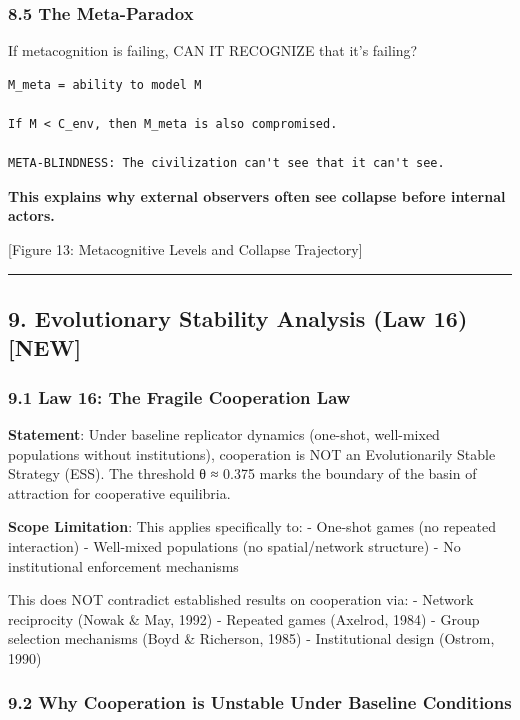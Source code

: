 \documentclass[11pt,letterpaper]{article}
\begin{document}
\subsubsection{8.5 The Meta-Paradox}\label{the-meta-paradox}

If metacognition is failing, CAN IT RECOGNIZE that it's failing?

\begin{verbatim}
M_meta = ability to model M

If M < C_env, then M_meta is also compromised.

META-BLINDNESS: The civilization can't see that it can't see.
\end{verbatim}

\textbf{This explains why external observers often see collapse before
internal actors.}

{[}Figure 13: Metacognitive Levels and Collapse Trajectory{]}

\begin{center}\rule{0.5\linewidth}{0.5pt}\end{center}

\subsection{9. Evolutionary Stability Analysis (Law 16)
{[}NEW{]}}\label{evolutionary-stability-analysis-law-16-new}

\subsubsection{9.1 Law 16: The Fragile Cooperation
Law}\label{law-16-the-fragile-cooperation-law}

\textbf{Statement}: Under baseline replicator dynamics (one-shot,
well-mixed populations without institutions), cooperation is NOT an
Evolutionarily Stable Strategy (ESS). The threshold θ ≈ 0.375 marks the
boundary of the basin of attraction for cooperative equilibria.

\textbf{Scope Limitation}: This applies specifically to: - One-shot
games (no repeated interaction) - Well-mixed populations (no
spatial/network structure) - No institutional enforcement mechanisms

This does NOT contradict established results on cooperation via: -
Network reciprocity (Nowak \& May, 1992) - Repeated games (Axelrod,
1984) - Group selection mechanisms (Boyd \& Richerson, 1985) -
Institutional design (Ostrom, 1990)

\subsubsection{9.2 Why Cooperation is Unstable Under Baseline
Conditions}\label{why-cooperation-is-unstable-under-baseline-conditions}
\end{document}

